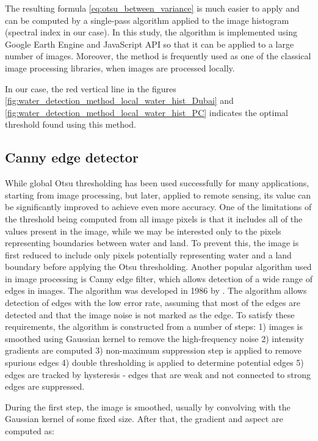 The resulting formula \ref{eq:otsu_between_variance} is much easier to apply and can be computed by a single-pass algorithm applied to the image histogram (spectral index in our case). In this study, the algorithm is implemented using Google Earth Engine and JavaScript API so that it can be applied to a large number of images. Moreover, the method is frequently used as one of the classical image processing libraries, when images are processed locally.

In our case, the red vertical line in the figures \ref{fig:water_detection_method_local_water_hist_Dubai} and \ref{fig:water_detection_method_local_water_hist_PC} indicates the optimal threshold found using this method.

\subsection{Canny edge detector}

While global Otsu thresholding has been used successfully for many applications, starting from image processing, but later, applied to remote sensing, its value can be significantly improved to achieve even more accuracy. One of the limitations of the threshold being computed from all image pixels is that it includes all of the values present in the image, while we may be interested only to the pixels representing boundaries between water and land. To prevent this, the image is first reduced to include only pixels potentially representing water and a land boundary before applying the Otsu thresholding. Another popular algorithm used in image processing is Canny edge filter, which allows detection of a wide range of edges in images. The algorithm was developed in 1986 by \citet{canny1986computational}. The algorithm allows detection of edges with the low error rate, assuming that most of the edges are detected and that the image noise is not marked as the edge. To satisfy these requirements, the algorithm is constructed from a number of steps: 1) images is smoothed using Gaussian kernel to remove the high-frequency noise 2) intensity gradients are computed 3) non-maximum suppression step is applied to remove spurious edges 4) double thresholding is applied to determine potential edges 5) edges are tracked by hysteresis - edges that are weak and not connected to strong edges are suppressed.

During the first step, the image is smoothed, usually by convolving with the Gaussian kernel of some fixed size. After that, the gradient and aspect are computed as:

